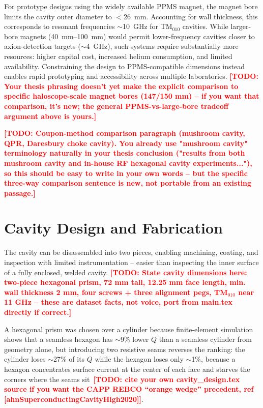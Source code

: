 \documentclass[10pt,journal]{IEEEtran}
\newcommand{\TODO}[1]{\textcolor{red}{\textbf{[TODO: #1]}}}
\begin{document}
For prototype designs using the widely available PPMS magnet, the magnet bore limits the cavity outer diameter to $<$\SI{26}{\milli\meter}. Accounting for wall thickness, this corresponds to resonant frequencies $\sim$\SI{10}{\giga\hertz} for TM$_{010}$ cavities. While larger-bore magnets (\SIrange{40}{100}{\milli\meter}) would permit lower-frequency cavities closer to axion-detection targets ($\sim$\SI{4}{\giga\hertz}), such systems require substantially more resources: higher capital cost, increased helium consumption, and limited availability. Constraining the design to PPMS-compatible dimensions instead enables rapid prototyping and accessibility across multiple laboratories. \TODO{Your thesis phrasing doesn't yet make the explicit comparison to specific haloscope-scale magnet bores (147/150 mm) -- if you want that comparison, it's new; the general PPMS-vs-large-bore tradeoff argument above is yours.}

\TODO{Coupon-method comparison paragraph (mushroom cavity, QPR, Daresbury choke cavity). You already use "mushroom cavity" terminology naturally in your thesis conclusion ("results from both mushroom cavity and in-house RF hexagonal cavity experiments..."), so this should be easy to write in your own words -- but the specific three-way comparison sentence is new, not portable from an existing passage.}

\section{Cavity Design and Fabrication}

The cavity can be disassembled into two pieces, enabling machining, coating, and inspection with limited instrumentation -- easier than inspecting the inner surface of a fully enclosed, welded cavity. \TODO{State cavity dimensions here: two-piece hexagonal prism, 72 mm tall, 12.25 mm face length, min. wall thickness 2 mm, four screws + three alignment pegs, TM$_{010}$ near 11 GHz -- these are dataset facts, not voice, port from main.tex directly if correct.}

A hexagonal prism was chosen over a cylinder because finite-element simulation shows that a seamless hexagon has $\sim$9\% lower $Q$ than a seamless cylinder from geometry alone, but introducing two resistive seams reverses the ranking: the cylinder loses $\sim$27\% of its $Q$ while the hexagon loses only $\sim$1\%, because a hexagon concentrates surface current at the center of each face and starves the corners where the seams sit~\TODO{cite your own cavity\_design.tex source if you want the CAPP REBCO ``orange wedge'' precedent, ref [ahnSuperconductingCavityHigh2020]}.
\end{document}
